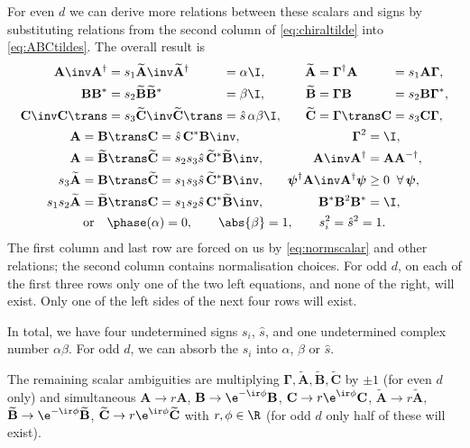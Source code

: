 \documentclass[11pt]{article}
\newcommand{\invd}{^{-\dag}}
\newcommand{\Gammab}{\boldsymbol{\Gamma}}
\newcommand{\A}{\mathbf{A}}
\newcommand{\B}{\mathbf{B}}
\renewcommand{\C}{\mathbf{C}}
\newcommand{\At}{\widetilde{\mathbf{A}}}
\newcommand{\Bt}{\widetilde{\mathbf{B}}}
\newcommand{\Ct}{\widetilde{\mathbf{C}}}
\newcommand{\psib}{\boldsymbol{\psi}}
\begin{document}
For even $d$ we can derive more relations between these scalars and signs by substituting relations from the second column of \cref{eq:chiraltilde} into \cref{eq:ABCtildes}.
The overall result is
%
\begin{equation}\label{eq:constnorm}
\begin{gathered}
\begin{alignedat}{4}
  \A\inv \A^\dag &= s_1 \At\inv \At^\dag &
        &= \alpha \I, &
    \At &= \Gammab^\dag \A &
        &= s_1 \A \Gammab,
  \\
  \B \B^\ast &= s_2 \Bt \Bt^\ast &
        &= \beta \I, &
    \Bt &= \Gammab \B &
        &= s_2 \B \Gammab^\ast,
  \\
  \C\inv \C\trans &= s_3 \Ct\inv \Ct\trans &
        &= \hat{s}\, \alpha \beta \I, &\qquad
    \Ct &= \Gammab\trans \C &
        &= s_3 \C \Gammab,
  \\
\end{alignedat}
\\
\begin{alignedat}{3}
  \A &= \B\trans \C &
        &= \hat{s}\, \C^\ast \B\inv, &\qquad
    \Gammab^2 &= \I,
  \\
  \A &= \Bt\trans \Ct &
        &= s_2 s_3 \hat{s}\, \Ct^\ast \Bt\inv, &\qquad
    \A\inv \A^\dag &= \A \A\invd,
  \\
  s_3 \At &= \B\trans \Ct &
        &= s_1 s_3 \hat{s}\, \Ct^\ast \B\inv, &\qquad
    \psib^\dag \A\inv \A^\dag \psib &\geq 0 \;\; \forall \, \psib,
  \\
  s_1 s_2 \At &= \Bt\trans \C &
        &= s_1 s_2 \hat{s}\, \C^\ast \Bt\inv, &
    \B^\ast \B^2 \B^\ast &= \I,
\end{alignedat}
\\
  \text{or}\quad
  \phase(\alpha) = 0, \qquad
  \abs{\beta} = 1, \qquad
  s_i^2 = \hat{s}^2 = 1.
\end{gathered}
\end{equation}
%
The first column and last row are forced on us by \cref{eq:normscalar} and other relations; the second column contains normalisation choices.
For odd $d$, on each of the first three rows only one of the two left equations, and none of the right, will exist.
Only one of the left sides of the next four rows will exist.

In total, we have four undetermined signs $s_i$, $\hat{s}$, and one undetermined complex number $\alpha \beta$.
For odd $d$, we can absorb the $s_i$ into $\alpha$, $\beta$ or $\hat{s}$.

The remaining scalar ambiguities are multiplying $\Gammab,\At,\Bt,\Ct$ by $\pm1$ (for even $d$ only)
and simultaneous \( \A \rightarrow r \A \),
\( \B \rightarrow \e^{-\ir\phi} \B \), \( \C \rightarrow r\e^{\ir\phi} \C \),
\( \At \rightarrow r \At \), \( \Bt \rightarrow \e^{-\ir\phi} \Bt \),
\( \Ct \rightarrow r\e^{\ir\phi} \Ct \) with \( r, \phi \in \R \) (for odd $d$ only half of these will exist).
\end{document}
